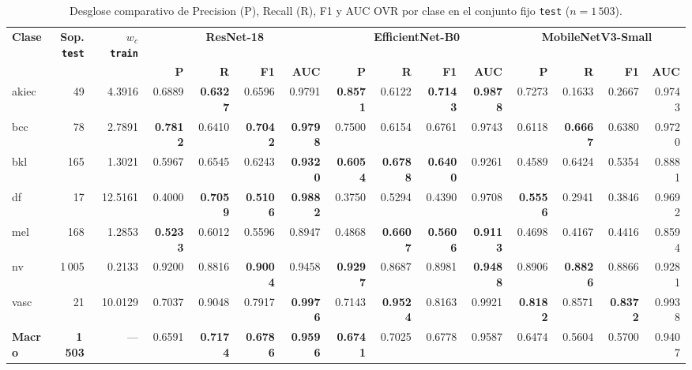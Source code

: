 \begin{table}[htbp]\centering\scriptsize
\setlength{\tabcolsep}{1.3pt}
\caption{Desglose comparativo de Precision (P), Recall (R), F1 y AUC OVR por clase en el conjunto fijo \texttt{test} ($n=1\,503$).}
\label{tab:res_clases}
\begin{tabular*}{\textwidth}{@{\extracolsep{\fill}}>{\ttfamily}lrr*{12}{r}@{}}
\toprule
\textrm{\textbf{Clase}} & \makecell[r]{\textbf{Sop.}\\\textbf{\texttt{test}}} & \makecell[r]{\textbf{$w_c$}\\\textbf{\texttt{train}}} & \multicolumn{4}{c}{\textbf{ResNet-18}} & \multicolumn{4}{c}{\textbf{EfficientNet-B0}} & \multicolumn{4}{c}{\textbf{MobileNetV3-Small}} \\
\cmidrule(lr){4-7}\cmidrule(lr){8-11}\cmidrule(lr){12-15}
 & & & \textbf{P} & \textbf{R} & \textbf{F1} & \textbf{AUC} & \textbf{P} & \textbf{R} & \textbf{F1} & \textbf{AUC} & \textbf{P} & \textbf{R} & \textbf{F1} & \textbf{AUC} \\ \midrule
akiec & 49 & 4.3916 & 0.6889 & \textbf{0.6327} & 0.6596 & 0.9791 & \textbf{0.8571} & 0.6122 & \textbf{0.7143} & \textbf{0.9878} & 0.7273 & 0.1633 & 0.2667 & 0.9743 \\
bcc & 78 & 2.7891 & \textbf{0.7812} & 0.6410 & \textbf{0.7042} & \textbf{0.9798} & 0.7500 & 0.6154 & 0.6761 & 0.9743 & 0.6118 & \textbf{0.6667} & 0.6380 & 0.9720 \\
bkl & 165 & 1.3021 & 0.5967 & 0.6545 & 0.6243 & \textbf{0.9320} & \textbf{0.6054} & \textbf{0.6788} & \textbf{0.6400} & 0.9261 & 0.4589 & 0.6424 & 0.5354 & 0.8881 \\
df & 17 & 12.5161 & 0.4000 & \textbf{0.7059} & \textbf{0.5106} & \textbf{0.9882} & 0.3750 & 0.5294 & 0.4390 & 0.9708 & \textbf{0.5556} & 0.2941 & 0.3846 & 0.9692 \\
mel & 168 & 1.2853 & \textbf{0.5233} & 0.6012 & 0.5596 & 0.8947 & 0.4868 & \textbf{0.6607} & \textbf{0.5606} & \textbf{0.9113} & 0.4698 & 0.4167 & 0.4416 & 0.8594 \\
nv & 1\,005 & 0.2133 & 0.9200 & 0.8816 & \textbf{0.9004} & 0.9458 & \textbf{0.9297} & 0.8687 & 0.8981 & \textbf{0.9488} & 0.8906 & \textbf{0.8826} & 0.8866 & 0.9281 \\
vasc & 21 & 10.0129 & 0.7037 & 0.9048 & 0.7917 & \textbf{0.9976} & 0.7143 & \textbf{0.9524} & 0.8163 & 0.9921 & \textbf{0.8182} & 0.8571 & \textbf{0.8372} & 0.9938 \\ \midrule
\textrm{\textbf{Macro}} & \textbf{1\,503} & --- & 0.6591 & \textbf{0.7174} & \textbf{0.6786} & \textbf{0.9596} & \textbf{0.6741} & 0.7025 & 0.6778 & 0.9587 & 0.6474 & 0.5604 & 0.5700 & 0.9407 \\
\bottomrule
\end{tabular*}
\end{table}

